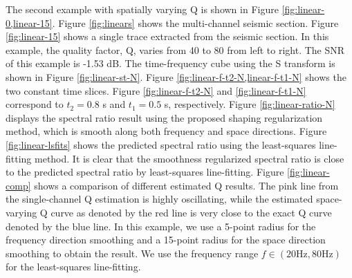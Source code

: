 The second example with spatially varying Q is shown in Figure \ref{fig:linear-0,linear-15}. Figure \ref{fig:linears} shows the multi-channel seismic section. Figure \ref{fig:linear-15} shows a single trace extracted from the seismic section. In this example, the quality factor, Q, varies from 40 to 80 from left to right. The SNR of this example is -1.53 dB. The time-frequency cube using the S transform is shown in Figure \ref{fig:linear-st-N}. Figure \ref{fig:linear-f-t2-N,linear-f-t1-N} shows the two constant time slices. Figure \ref{fig:linear-f-t2-N} and \ref{fig:linear-f-t1-N} correspond to $t_2=0.8$ s and $t_1=0.5$ s, respectively. Figure \ref{fig:linear-ratio-N} displays the spectral ratio result using the proposed shaping regularization method, which is smooth along both frequency and space directions. Figure \ref{fig:linear-lsfits} shows the predicted spectral ratio using the least-squares line-fitting method. It is clear that the smoothness regularized spectral ratio is close to the predicted spectral ratio by least-squares line-fitting. Figure \ref{fig:linear-comp} shows a comparison of different estimated Q results. The pink line from the single-channel Q estimation is highly oscillating, while the estimated space-varying Q curve as denoted by the red line is very close to the exact Q curve denoted by the blue line. In this example, we use a 5-point radius for the frequency direction smoothing and a 15-point radius for the space direction smoothing to obtain the result. We use the frequency range $f\in(20\text{Hz},80 \text{Hz})$ for the least-squares line-fitting. 

